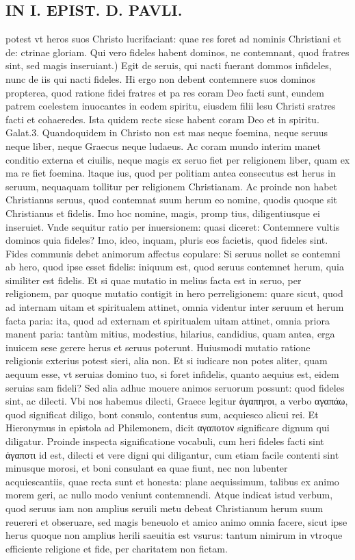 \documentclass{article}
\begin{document}
\begin{pages}
\section*{IN I. EPIST. D. PAVLI. }
\marginpar{[ p.120 ]}\pstart potest vt heros suos Christo lucrifaciant: quae res foret ad nominis Christiani et de: ctrinae gloriam.  \pend\pstart Qui vero fideles habent dominos, ne contemnant, quod fratres sint, sed magis inseruiant.) Egit de seruis, qui nacti fuerant dommos infideles, nunc de iis qui nacti fideles. Hi ergo non debent contemnere suos dominos propterea, quod ratione fidei fratres et pa res coram Deo facti sunt, eundem patrem coelestem inuocantes in eodem spiritu, eiusdem filii lesu Christi sratres facti et cohaeredes. Ista quidem recte sicse habent coram Deo et in spiritu. Galat.3. Quandoquidem in Christo non est mas neque foemina, neque seruus neque liber, neque Graecus neque ludaeus. Ac coram mundo interim manet conditio externa et ciuilis, neque magis ex seruo fiet per religionem liber, quam ex ma re fiet foemina. ltaque ius, quod per politiam antea consecutus est herus in seruum, nequaquam tollitur per religionem Christianam. Ac proinde non habet Christianus seruus, quod contemnat suum herum eo nomine, quodis quoque sit Christianus et fidelis. Imo hoc nomine, magis, promp tius, diligentiusque ei inseruiet. Vnde sequitur ratio per inuersionem: quasi diceret: Contemnere vultis dominos quia fideles? Imo, ideo, inquam, pluris eos facietis, quod fideles sint. Fides communis debet animorum affectus copulare: Si seruus nollet se contemni ab hero, quod ipse esset fidelis: iniquum est, quod seruus contemnet herum, quia similiter est fidelis. Et si quae mutatio in melius facta est in seruo, per religionem, par quoque mutatio contigit in hero perreligionem: quare sicut, quod ad internam uitam et spiritualem attinet, omnia videntur inter seruum et herum facta paria: ita, quod ad externam et spiritualem uitam attinet, omnia priora manent paria: tantùm mitius, modestius, hilarius, candidius, quam antea, erga inuicem sese gerere herus et seruus poterunt. Huiusmodi mutatio ratione religionis exterius potest sieri, alia non. Et si iudicare non potes aliter, quam aequum esse, vt seruias domino tuo, si foret infidelis, quanto aequius est, eidem seruias sam fideli? Sed alia adhuc mouere animos seruorum possunt: quod fideles sint, ac dilecti. Vbi nos habemus dilecti, Graece legitur ἀγαπηrοι, a verbo αγαπάω, quod significat diligo, bont consulo, contentus sum, acquiesco alicui rei. Et Hieronymus in epistola ad Philemonem, dicit αγαποτον significare dignum qui diligatur. Proinde inspecta significatione vocabuli, cum heri fideles facti sint ἀγαποτι id est, dilecti et vere digni qui diligantur, cum etiam facile contenti sint minusque morosi, et boni consulant ea quae fiunt, nec non lubenter acquiescantiis, quae recta sunt et honesta: plane aequissimum, talibus ex animo morem geri, ac nullo modo veniunt contemnendi. Atque indicat istud verbum, quod seruus iam non amplius seruili metu debeat Christianum herum suum reuereri et obseruare, sed magis beneuolo et amico animo omnia facere, sicut ipse herus quoque non amplius herili saeuitia est vsurus: tantum nimirum in vtroque efficiente religione et fide, per charitatem non fictam. 
\end{pages}
\end{document}
